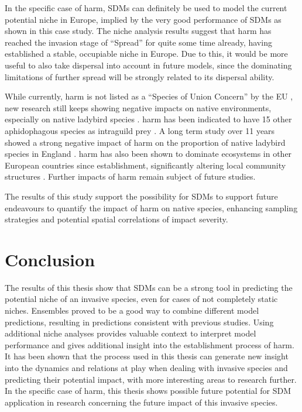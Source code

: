 \documentclass[12pt,a4paper]{article}
\begin{document}
In the specific case of \gls{harm}, SDMs can definitely be used to model the current potential niche in Europe, implied by the very good performance of SDMs as shown in this case study.
The niche analysis results suggest that \gls{harm} has reached the invasion stage of ``Spread'' for quite some time already, having established a stable, occupiable niche in Europe.
Due to this, it would be more useful to also take dispersal into account in future models, since the dominating limitations of further spread will be strongly related to its dispersal ability.

While currently, \gls{harm} is not listed as a ``Species of Union Concern'' by the EU \autocite{EU2020speciesofunionconcern}, new research still keeps showing negative impacts on native environments, especially on native ladybird species \autocite{brown2022harmimpactigp}.
\gls{harm} has been indicated to have 15 other aphidophagous species as intraguild prey \autocite{lucas2007axyridisintra}.
A long term study over 11 years showed a strong negative impact of \gls{harm} on the proportion of native ladybird species in England \autocite{brown2018harmlongterm}.
\gls{harm} has also been shown to dominate ecosystems in other European countries since establishment, significantly altering local community structures \autocite{masetti2018harmitaly, honek2019harmczech}.
Further impacts of \gls{harm} remain subject of future studies.

The results of this study support the possibility for SDMs to support future endeavours to quantify the impact of \gls{harm} on native species, enhancing sampling strategies and potential spatial correlations of impact severity.

\clearpage
\section{Conclusion} \label{sec:conclusion}
The results of this thesis show that SDMs can be a strong tool in predicting the potential niche of an invasive species, even for cases of not completely static niches.
Ensembles proved to be a good way to combine different model predictions, resulting in predictions consistent with previous studies.
Using additional niche analyses provides valuable context to interpret model performance and gives additional insight into the establishment process of \gls{harm}.
It has been shown that the process used in this thesis can generate new insight into the dynamics and relations at play when dealing with invasive species and predicting their potential impact, with more interesting areas to research further.
In the specific case of \gls{harm}, this thesis shows possible future potential for SDM application in research concerning the future impact of this invasive species.
\end{document}

